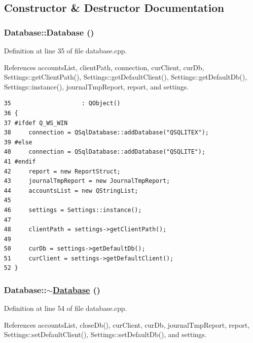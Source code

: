 \subsection{Constructor \& Destructor Documentation}
\hypertarget{classDatabase_d0}{
\subsubsection[Database]{\setlength{\rightskip}{0pt plus 5cm}Database::Database ()}}
\label{classDatabase_d0}


Definition at line 35 of file database.cpp.

References accounts\-List, client\-Path, connection, cur\-Client, cur\-Db, Settings::get\-Client\-Path(), Settings::get\-Default\-Client(), Settings::get\-Default\-Db(), Settings::instance(), journal\-Tmp\-Report, report, and settings.

\footnotesize\begin{verbatim}35                    : QObject()
36 {
37 #ifdef Q_WS_WIN
38     connection = QSqlDatabase::addDatabase("QSQLITEX");
39 #else
40     connection = QSqlDatabase::addDatabase("QSQLITE");
41 #endif
42     report = new ReportStruct;
43     journalTmpReport = new JournalTmpReport;
44     accountsList = new QStringList;
45 
46     settings = Settings::instance();
47 
48     clientPath = settings->getClientPath();
49     
50     curDb = settings->getDefaultDb();
51     curClient = settings->getDefaultClient();
52 }
\end{verbatim}\normalsize 


\hypertarget{classDatabase_d1}{
\subsubsection[$\sim$Database]{\setlength{\rightskip}{0pt plus 5cm}Database::$\sim$\hyperlink{classDatabase}{Database} ()}}
\label{classDatabase_d1}


Definition at line 54 of file database.cpp.

References accounts\-List, close\-Db(), cur\-Client, cur\-Db, journal\-Tmp\-Report, report, Settings::set\-Default\-Client(), Settings::set\-Default\-Db(), and settings.

